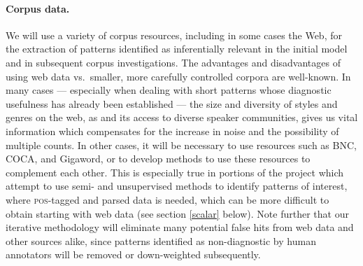\documentclass[10pt]{article}
\begin{document}


\vspace {-4mm}

\paragraph{Corpus data.}
We will use a variety of corpus resources, including in some cases the Web, for the extraction of patterns identified as inferentially relevant in the initial model and in subsequent corpus investigations. 
The advantages and disadvantages of using web data vs.\ smaller, more carefully controlled corpora are well-known.
In many cases --- especially when dealing with short patterns whose diagnostic usefulness has already been established --- the size and diversity of styles and genres on the web, as and its access to diverse speaker communities, gives us vital information which compensates for the increase in noise and the possibility of multiple counts.
In other cases, it will be necessary to use resources such as BNC, COCA, and Gigaword, or to develop methods to use these resources to complement each other.
This is especially true in portions of the project which attempt to use semi- and unsupervised methods to identify patterns of interest, where \textsc{pos}-tagged and parsed data is needed, which can be more difficult to obtain starting with web data (see section \ref{scalar} below).
Note further that  our iterative methodology will eliminate many potential false hits from web data and other sources alike, since patterns  identified as non-diagnostic by human annotators will be removed or down-weighted subsequently.
\end{document}
